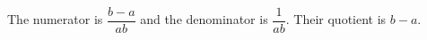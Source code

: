 The numerator is $\dfrac{b-a}{ab}$ and the denominator is $\dfrac{1}{ab}$. Their quotient is $\boxed{b-a}$.
